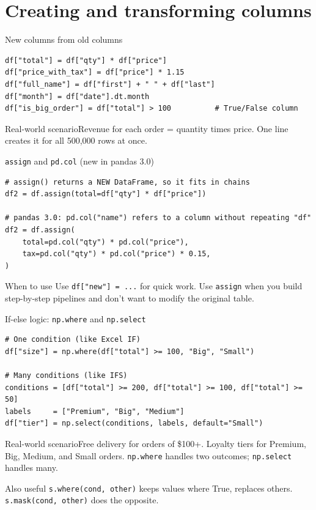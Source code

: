 \documentclass[aspectratio=169,10pt]{beamer}
\newcommand{\code}[1]{\texttt{#1}}
\newcommand{\scenario}[1]{\begin{exampleblock}{Real-world scenario}#1\end{exampleblock}}
\begin{document}
\section{Creating and transforming columns}

\begin{frame}[fragile]{New columns from old columns}
\begin{lstlisting}
df["total"] = df["qty"] * df["price"]
df["price_with_tax"] = df["price"] * 1.15
df["full_name"] = df["first"] + " " + df["last"]
df["month"] = df["date"].dt.month
df["is_big_order"] = df["total"] > 100          # True/False column
\end{lstlisting}
  \scenario{Revenue for each order = quantity times price. One line creates it for all
  500{,}000 rows at once.}
\end{frame}

\begin{frame}[fragile]{\texttt{assign} and \texttt{pd.col} (new in pandas 3.0)}
\begin{lstlisting}
# assign() returns a NEW DataFrame, so it fits in chains
df2 = df.assign(total=df["qty"] * df["price"])

# pandas 3.0: pd.col("name") refers to a column without repeating "df"
df2 = df.assign(
    total=pd.col("qty") * pd.col("price"),
    tax=pd.col("qty") * pd.col("price") * 0.15,
)
\end{lstlisting}
  \begin{block}{When to use}
    Use \code{df["new"] = ...} for quick work. Use \code{assign} when you build step-by-step
    pipelines and don't want to modify the original table.
  \end{block}
\end{frame}

\begin{frame}[fragile]{If-else logic: \texttt{np.where} and \texttt{np.select}}
\begin{lstlisting}
# One condition (like Excel IF)
df["size"] = np.where(df["total"] >= 100, "Big", "Small")

# Many conditions (like IFS)
conditions = [df["total"] >= 200, df["total"] >= 100, df["total"] >= 50]
labels     = ["Premium", "Big", "Medium"]
df["tier"] = np.select(conditions, labels, default="Small")
\end{lstlisting}
  \scenario{Free delivery for orders of \$100+. Loyalty tiers for Premium, Big, Medium, and
  Small orders. \code{np.where} handles two outcomes; \code{np.select} handles many.}
  \begin{block}{Also useful}
    \code{s.where(cond, other)} keeps values where True, replaces others. \code{s.mask(cond, other)} does the opposite.
  \end{block}
\end{frame}
\end{document}
